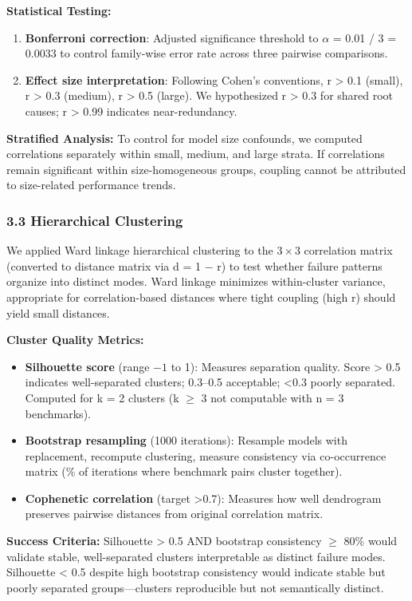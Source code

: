 \textbf{Statistical Testing:}
\begin{enumerate}
\item \textbf{Bonferroni correction}: Adjusted significance threshold to $\alpha$ = 0.01 / 3 = 0.0033 to control family-wise error rate across three pairwise comparisons.
\item \textbf{Effect size interpretation}: Following Cohen's conventions, r > 0.1 (small), r > 0.3 (medium), r > 0.5 (large). We hypothesized r > 0.3 for shared root causes; r > 0.99 indicates near-redundancy.
\end{enumerate}

\textbf{Stratified Analysis:} To control for model size confounds, we computed correlations separately within small, medium, and large strata. If correlations remain significant within size-homogeneous groups, coupling cannot be attributed to size-related performance trends.

\subsubsection{3.3 Hierarchical Clustering}

We applied Ward linkage hierarchical clustering to the $3\times 3$ correlation matrix (converted to distance matrix via d = 1 $-$ r) to test whether failure patterns organize into distinct modes. Ward linkage minimizes within-cluster variance, appropriate for correlation-based distances where tight coupling (high r) should yield small distances.

\textbf{Cluster Quality Metrics:}
\begin{itemize}
\item \textbf{Silhouette score} (range $-1$ to 1): Measures separation quality. Score > 0.5 indicates well-separated clusters; 0.3--0.5 acceptable; <0.3 poorly separated. Computed for k = 2 clusters (k $\geq$ 3 not computable with n = 3 benchmarks).
\item \textbf{Bootstrap resampling} (1000 iterations): Resample models with replacement, recompute clustering, measure consistency via co-occurrence matrix (\% of iterations where benchmark pairs cluster together).
\item \textbf{Cophenetic correlation} (target >0.7): Measures how well dendrogram preserves pairwise distances from original correlation matrix.
\end{itemize}

\textbf{Success Criteria:} Silhouette > 0.5 AND bootstrap consistency $\geq$ 80\% would validate stable, well-separated clusters interpretable as distinct failure modes. Silhouette < 0.5 despite high bootstrap consistency would indicate stable but poorly separated groups---clusters reproducible but not semantically distinct.

